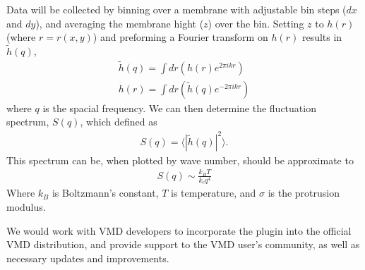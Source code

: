 \documentclass{article}
\begin{document}
Data will be collected by binning over a membrane with adjustable bin steps ($dx$ and $dy$), and averaging the membrane hight ($z$) over the bin. Setting $z$ to $h(r)$ (where $r=r(x,y)$) and preforming a Fourier transform on $h(r)$ results in $\tilde{h}(q)$,
	\begin{equation}
		\begin{aligned}
		\tilde{h}(q)=\int dr (h(r) e^{2 \pi i k r})\\
		h(r)=\int dr (\tilde{h}(q) e^{-2 \pi i k r})
		\label{eq:For}
		\end{aligned}
	\end{equation}
where $q$ is the spacial frequency. We can then determine the fluctuation spectrum, $S(q)$, which \cite{Goetz1999} defined as
  \begin{equation}
    \begin{aligned}
      S(q)=\langle|\tilde{h}(q)|^{2}\rangle.
    \end{aligned}
    \label{eq:s1}
  \end{equation}
This spectrum can be, when plotted by wave number, should be approximate to 
  \begin{equation}
    \begin{aligned}
      S(q)\sim\frac{k_BT}{k_c q^4}%
    \end{aligned}
    \label{eq:s2}
  \end{equation}
Where $k_B$ is Boltzmann's constant, $T$ is temperature, and $\sigma$ is the protrusion modulus.

We would work with VMD developers to incorporate the plugin into the official VMD distribution, and provide support to the VMD user’s community, as well as necessary updates and improvements.


\printbibliography
\end{document}
